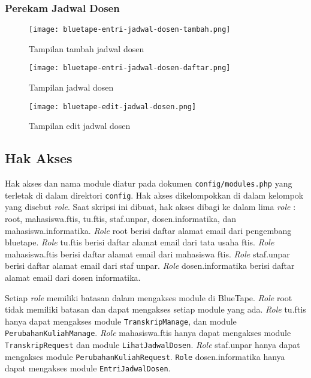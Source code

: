 \subsubsection{Perekam Jadwal Dosen}
\begin{figure}[H]
	\centering  
	\texttt{[image: bluetape-entri-jadwal-dosen-tambah.png]}  
	\caption[Tampilan tambah jadwal dosen]{Tampilan tambah jadwal dosen} 
	\label{fig:bluetape-entri-jadwal-dosen-tambah} 
\end{figure}

\begin{figure}[H]
	\centering  
	\texttt{[image: bluetape-entri-jadwal-dosen-daftar.png]}  
	\caption[Tampilan jadwal dosen]{Tampilan jadwal dosen} 
	\label{fig:bluetape-entri-jadwal-dosen-daftar} 
\end{figure}

\begin{figure}[H]
	\centering  
	\texttt{[image: bluetape-edit-jadwal-dosen.png]}  
	\caption[Tampilan edit jadwal dosen]{Tampilan edit jadwal dosen} 
	\label{fig:bluetape-edit-jadwal-dosen} 
\end{figure}

\subsection{Hak Akses}
Hak akses dan nama module diatur pada dokumen \texttt{config/modules.php} yang terletak di dalam direktori \texttt{config}. Hak akses dikelompokkan di dalam kelompok yang disebut \textit{role}. Saat skripsi ini dibuat, hak akses dibagi ke dalam lima \textit{role} : root, mahasiswa.ftis, tu.ftis, staf.unpar, dosen.informatika, dan mahasiswa.informatika. \textit{Role} root berisi daftar alamat email dari pengembang bluetape. \textit{Role} tu.ftis berisi daftar alamat email dari tata usaha ftis. \textit{Role} mahasiswa.ftis berisi daftar alamat email dari mahasiswa ftis. \textit{Role} staf.unpar berisi daftar alamat email dari staf unpar. \textit{Role} dosen.informatika berisi daftar alamat email dari dosen informatika.

Setiap \textit{role} memiliki batasan dalam mengakses module di BlueTape. \textit{Role} root tidak memiliki batasan dan dapat mengakses setiap module yang ada. \textit{Role} tu.ftis hanya dapat mengakses module \texttt{TranskripManage}, dan module \texttt{PerubahanKuliahManage}. \textit{Role} mahasiswa.ftis hanya dapat mengakses module \texttt{TranskripRequest} dan module \texttt{LihatJadwalDosen}. \textit{Role} staf.unpar hanya dapat mengakses module \texttt{PerubahanKuliahRequest}. \texttt{Role} dosen.informatika hanya dapat mengakses module \texttt{EntriJadwalDosen}.

